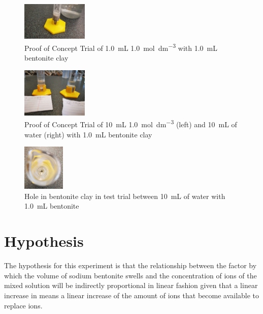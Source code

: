 \documentclass[11pt, letterpaper]{article}
\begin{document}
\begin{paracol}{3}

    \begin{figure}[H]
        \centering
        \includegraphics[width=0.28\textwidth]{poc1MHCL.jpg}
        \caption{Proof of Concept Trial of \SI{1.0}{mL} \SI{1.0}{mol.dm^{-3}}  with \SI{1.0}{mL} bentonite clay}
        \label{fig:poc1MHCL}
    \end{figure}
    \switchcolumn


    \begin{figure}[H]
        \centering
        \includegraphics[width=0.28\textwidth]{betterPOC.jpg}
        \caption{Proof of Concept Trial of \SI{10}{mL} \SI{1.0}{mol.dm^{-3}}  (left) and \SI{10}{mL} of water (right) with \SI{1.0}{mL} bentonite clay}
        \label{fig:betterPOC}
    \end{figure}

    \switchcolumn
    \begin{figure}[H]
        \centering
        \includegraphics[width=0.18\textwidth]{hole.jpg}
        \caption{Hole in bentonite clay in test trial between \SI{10}{mL} of water with \SI{1.0}{mL} bentonite}
        \label{fig:hole}
    \end{figure}

\end{paracol}

\section{Hypothesis}

The hypothesis for this experiment is that the relationship between
the factor by which the volume of
sodium bentonite swells and the concentration of  ions of the mixed
solution will be indirectly proportional in linear fashion
given that a linear increase in \ce{[H+]} means a linear increase
of the amount of  ions that become available to replace  ions.
\end{document}
